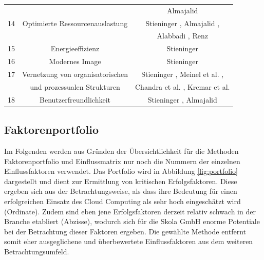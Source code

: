 \begin{table}[!htb]
\begin{center}
{\begin{tabular}{c c c }
				&& Almajalid \cite{almajalid} \\
				14 & Optimierte Ressourcenauslastung & Stieninger \cite{stieninger}, Almajalid \cite{almajalid}, \\
				&& Alabbadi \cite{alabbadi}, Renz \cite{renz} \\
				15 & Energieeffizienz & Stieninger \cite{stieninger} \\
				16 & Modernes Image & Stieninger \cite{stieninger} \\
				17 & Vernetzung von organisatorischen & Stieninger \cite{stieninger}, Meinel et al. \cite{meinel}, \\
				& und prozessualen Strukturen & Chandra et al. \cite{chandra}, Krcmar et al. \cite{krcmar} \\
				18 & Benutzerfreundlichkeit & Stieninger \cite{stieninger}, Almajalid \cite{almajalid} \\
				\hline
			\end{tabular}
		}
		\label{tab:factors1}
	\end{center}
\end{table}
\FloatBarrier

\subsection{Faktorenportfolio}

Im Folgenden werden aus Gründen der Übersichtlichkeit für die Methoden Faktorenportfolio und Einflussmatrix nur noch die Nummern der einzelnen Einflussfaktoren verwendet. Das Portfolio wird in Abbildung \ref{fig:portfolio} dargestellt und dient zur Ermittlung von kritischen Erfolgsfaktoren. Diese ergeben sich aus der Betrachtungsweise, als dass ihre Bedeutung für einen erfolgreichen Einsatz des Cloud Computing als sehr hoch eingeschätzt wird (Ordinate). Zudem sind eben jene Erfolgsfaktoren derzeit relativ schwach in der Branche etabliert (Abzisse), wodurch sich für die Skola GmbH enorme Potentiale bei der Betrachtung dieser Faktoren ergeben. Die gewählte Methode entfernt somit eher ausgeglichene und überbewertete Einflussfaktoren aus dem weiteren Betrachtungsumfeld.

